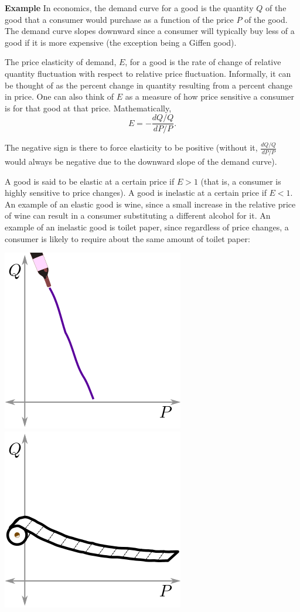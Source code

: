 \documentclass[twoside,openright,titlepage,a4paper]{book}
\begin{document}
\begin{sloppypar}
\textbf{Example} In economics, the demand curve for a good is the quantity $Q$ of the good that a consumer would purchase as a function of the price $P$ of the good. The demand curve slopes downward since a consumer will typically buy less of a good if it is more expensive (the exception being a Giffen good).

The price elasticity of demand, $E$, for a good is the rate of change of relative quantity fluctuation with respect to relative price fluctuation. Informally, it can be thought of as the percent change in quantity resulting from a percent change in price. One can also think of $E$ as a measure of how price sensitive a consumer is for that good at that price. Mathematically, \[ E = -\frac{dQ/Q}{dP/P}. \]

The negative sign is there to force elasticity to be positive (without it, $\frac{dQ/Q}{dP/P}$ would always be negative due to the downward slope of the demand curve).

A good is said to be elastic at a certain price if $E>1$ (that is, a consumer is highly sensitive to price changes). A good is inelastic at a certain price if $E<1$. An example of an elastic good is wine, since a small increase in the relative price of wine can result in a consumer substituting a different alcohol for it. An example of an inelastic good is toilet paper, since regardless of price changes, a consumer is likely to require about the same amount of toilet paper:
\begin{center}
	\includegraphics[scale=0.6]{WineElasticity}
	\includegraphics[scale=0.6]{TPElasticity}
\end{center}


\end{sloppypar}
\end{document}
